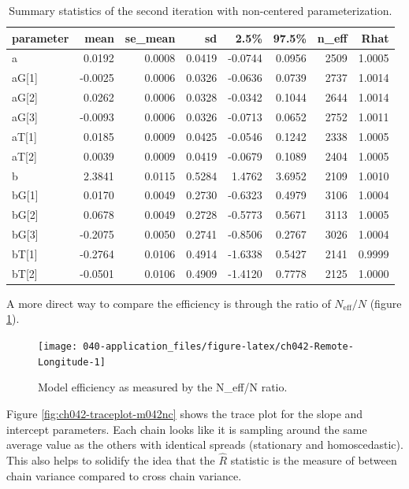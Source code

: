 \documentclass[11pt, oneside, openany]{scrbook}
\begin{document}
\begin{table}[!h]

\caption{\label{tab:ch042-Bleeding-Tuna}Summary statistics of the second iteration with non-centered parameterization.}
\centering
\begin{tabular}[t]{lrrrrrrr}
\toprule
parameter & mean & se\_mean & sd & 2.5\% & 97.5\% & n\_eff & Rhat\\
\midrule
a & 0.0192 & 0.0008 & 0.0419 & -0.0744 & 0.0956 & 2509 & 1.0005\\
aG[1] & -0.0025 & 0.0006 & 0.0326 & -0.0636 & 0.0739 & 2737 & 1.0014\\
aG[2] & 0.0262 & 0.0006 & 0.0328 & -0.0342 & 0.1044 & 2644 & 1.0014\\
aG[3] & -0.0093 & 0.0006 & 0.0326 & -0.0713 & 0.0652 & 2752 & 1.0011\\
aT[1] & 0.0185 & 0.0009 & 0.0425 & -0.0546 & 0.1242 & 2338 & 1.0005\\
\addlinespace
aT[2] & 0.0039 & 0.0009 & 0.0419 & -0.0679 & 0.1089 & 2404 & 1.0005\\
b & 2.3841 & 0.0115 & 0.5284 & 1.4762 & 3.6952 & 2109 & 1.0010\\
bG[1] & 0.0170 & 0.0049 & 0.2730 & -0.6323 & 0.4979 & 3106 & 1.0004\\
bG[2] & 0.0678 & 0.0049 & 0.2728 & -0.5773 & 0.5671 & 3113 & 1.0005\\
bG[3] & -0.2075 & 0.0050 & 0.2741 & -0.8506 & 0.2767 & 3026 & 1.0004\\
\addlinespace
bT[1] & -0.2764 & 0.0106 & 0.4914 & -1.6338 & 0.5427 & 2141 & 0.9999\\
bT[2] & -0.0501 & 0.0106 & 0.4909 & -1.4120 & 0.7778 & 2125 & 1.0000\\
\bottomrule
\end{tabular}
\end{table}

A more direct way to compare the efficiency is through the ratio of \(N_{\mathrm{eff}} / N\) (figure \ref{fig:ch042-Remote-Longitude}).

\begin{figure}

{\centering \texttt{[image: 040-application\_files/figure-latex/ch042-Remote-Longitude-1]} 

}

\caption{Model efficiency as measured by the N\_eff/N ratio.}\label{fig:ch042-Remote-Longitude}
\end{figure}

Figure \ref{fig:ch042-traceplot-m042nc} shows the trace plot for the slope and intercept parameters. Each chain looks like it is sampling around the same average value as the others with identical spreads (stationary and homoscedastic). This also helps to solidify the idea that the \(\hat{R}\) statistic is the measure of between chain variance compared to cross chain variance.
\end{document}
